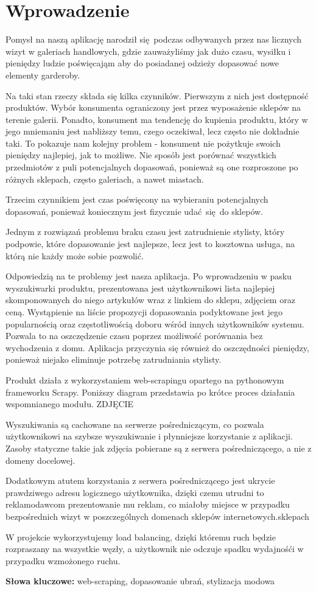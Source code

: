 \chapter{Wprowadzenie}

Pomysł na naszą aplikację narodził się podczas odbywanych przez nas licznych wizyt w galeriach handlowych, gdzie zauważyliśmy jak dużo czasu, wysiłku i pieniędzy ludzie poświęcająm aby do posiadanej odzieży dopasować nowe elementy garderoby.

Na taki stan rzeczy składa się kilka czynników. Pierwszym z nich jest dostępność produktów. Wybór konsumenta ograniczony jest przez wyposażenie sklepów na terenie galerii. Ponadto, konsument ma tendencję do kupienia produktu, który w jego mniemaniu jest nabliższy temu, czego oczekiwał, lecz często nie dokładnie taki. To pokazuje nam kolejny problem - konsument nie pożytkuje swoich pieniędzy najlepiej, jak to możliwe. Nie sposób jest porównać wszystkich przedmiotów z puli potencjalnych dopasowań, ponieważ są one rozproszone po różnych sklepach, często galeriach, a nawet miastach. 

Trzecim czynnikiem jest czas poświęcony na wybieraniu potencjalnych dopasowań, ponieważ koniecznym jest fizycznie udać się do sklepów.

Jednym z rozwiązań problemu braku czasu jest zatrudnienie stylisty, który podpowie, które dopasowanie jest najlepsze, lecz jest to kosztowna usługa, na którą nie każdy może sobie pozwolić.

Odpowiedzią na te problemy jest nasza aplikacja. Po wprowadzeniu w pasku wyszukiwarki produktu, prezentowana jest użytkownikowi lista najlepiej skomponowanych do niego artykułów wraz z linkiem do sklepu, zdjęciem oraz ceną.
Wystąpienie na liście propozycji dopasowania podyktowane jest jego popularnością oraz częstotliwością doboru wśród innych użytkowników systemu.
Pozwala to na oszczędzenie czasu poprzez możliwość porównania bez wychodzenia z domu.
Aplikacja przyczynia się również do oszczędności pieniędzy, ponieważ niejako eliminuje potrzebę zatrudniania stylisty.

Produkt działa z wykorzystaniem web-scrapingu opartego na pythonowym frameworku Scrapy.
Poniższy diagram przedstawia po krótce proces działania wspomnianego modułu.
ZDJĘCIE

Wyszukiwania są cachowane na serwerze pośredniczącym, co pozwala użytkownikowi na szybsze wyszukiwanie i płynniejsze korzystanie z aplikacji.
Zasoby statyczne takie jak zdjęcia pobierane są z serwera pośredniczącego, a nie z domeny docelowej.

Dodatkowym atutem korzystania z serwera pośredniczącego jest ukrycie prawdziwego adresu logicznego użytkownika, dzięki czemu utrudni to reklamodawcom prezentowanie mu reklam, co miałoby miejsce w przypadku bezpośrednich wizyt w poszczególnych domenach sklepów internetowych.sklepach

W projekcie wykorzystujemy load balancing, dzięki któremu ruch będzie rozpraszany na wszystkie węzły, a użytkownik nie odczuje spadku wydajnośći w przypadku wzmożonego ruchu.

\textbf{Słowa kluczowe:} web-scraping, dopasowanie ubrań, stylizacja modowa